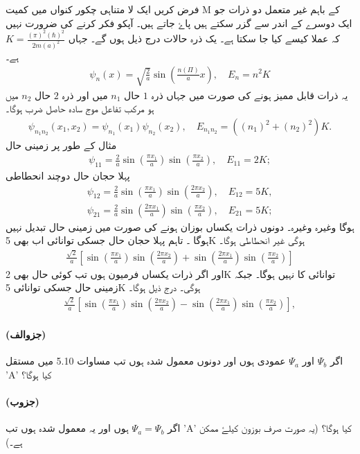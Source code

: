 فرض کریں ایک لا متناہی چکور کنواں میں کمیت M کے باہم غیر متعمل دو ذرات جو ایک دوسرے کے اندر سے گزر سکتے ہیں پاۓ جاتے ہیں۔ آپکو فکر کرنے کی ضرورت نہیں کہ عملا کیسے کیا جا سکتا ہے۔ یک ذرہ حالات درج ذیل ہوں گے۔ جہاں $ K=\frac{(\pi)^2 (\hbar)^2}{2m(a)^2 }
$
ہے۔
\begin{align*}
 \psi_{n} (x)=\sqrt{\frac{2}{a}}\sin(\frac{n (\Pi)}{a}x), \quad E_{n}=n^2 K 
\end{align*}
یہ ذرات قابل ممیز ہونے کی صورت میں جہاں ذرہ $ 1 $ حال   $ n_{1} $ میں اور ذرہ $ 2 $ حال $ n_{2} $  میں ہو مرکب تفاعل موج سادہ حاصل ضرب ہوگا۔
\begin{align*}
 \psi_{n_{1} n_{2}} (x_{1},x_{2})=\psi_{n_{1}}(x_{1})\psi_{n_{2}}(x_{2}), \quad E_{n_{1} n_{2}}= ((n_{1})^2+(n_{2})^2)K. 
\end{align*}
مثال کے طور پر زمینی حال
\begin{align*}
 \psi_{11}=\frac{2}{a}\sin(\frac{\pi x_{1}}{a}) \sin(\frac{\pi x_{2}}{a}), \quad E_{11}=2K; 
\end{align*}
پہلا حجان حال دوچند انحطاطی 
\begin{align*}
 \psi_{12}=\frac{2}{a}\sin(\frac{\pi x_{1}}{a}) \sin(\frac{2\pi x_{2}}{a}), \quad E_{12}=5K, \\
\psi_{21}=\frac{2}{a}\sin(\frac{2\pi x_{1}}{a}) \sin(\frac{\pi x_{2}}{a}), \quad E_{21}=5K; 
\end{align*}
ہوگا وغیرہ وغیرہ۔ دونوں ذرات یکساں بوزان ہونے کی صورت میں زمینی حال تبدیل نہیں ہوگا ۔ تاہم پہلا حجان حال جسکی توانائی اب بھی 5K ہوگی غیر انحطاطی ہوگا۔
\begin{align*}
\frac{\sqrt{2}}{a}[\sin(\frac{\pi x_{1}}{a})\sin(\frac{2\pi x_{2}}{a})+ \sin(\frac{2 \pi x_{1}}{a})\sin(\frac{\pi x_{2}}{a})]
\end{align*} 
اور اگر ذرات یکساں فرمیون ہوں تب کوئی حال بھی 2K توانائی کا نہیں ہوگا۔ جبکہ زمینی حال جسکی توانائی 5K ہوگی۔ درج ذیل ہوگا۔
\begin{align*}
\frac{\sqrt{2}}{a}[\sin(\frac{\pi x_{1}}{a}) \sin(\frac{2 \pi x_{2}}{a})- \sin(\frac{2 \pi x_{1}}{a}) \sin(\frac{\pi x_{2}}{a})], 
\end{align*}
\paragraph*{(جزوالف)}
اگر $ \Psi_{b} $ اور  $ \Psi_{a} $ عمودی ہوں اور دونوں معمول شدہ ہوں تب مساوات 5.10 میں مستقل 'A' کیا ہوگا؟ 
\paragraph*{(جزوب)}
اگر  $ \Psi_{a} = \Psi_{b} $ ہوں اور یہ معمول شدہ ہوں تب 'A' کیا ہوگا؟ (یہ صورت صرف بوزون کیلۓ ممکن ہے۔)
